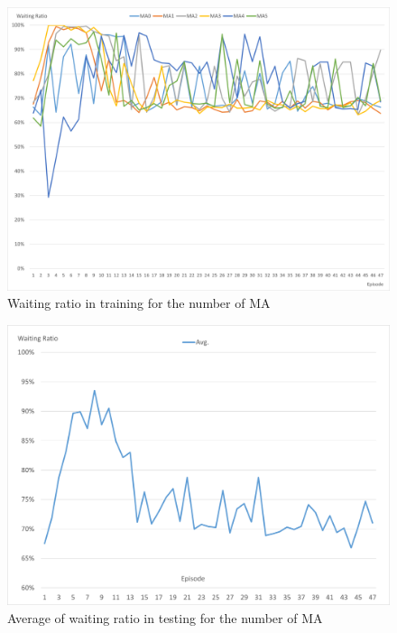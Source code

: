 \begin{figure}[htbp]
  \centering
  \includegraphics[scale=0.5]{./Figure/waitingTrain.png}
  \caption{Waiting ratio in training for the number of MA}
  \label{fig:waitingTrain}
\end{figure}

\begin{figure}[htbp]
  \centering
  \includegraphics[scale=0.5]{./Figure/waitingTrainAvg.png}
  \caption{Average of waiting ratio in testing for the number of MA}
  \label{fig:waitingTrainAvg}
\end{figure}

